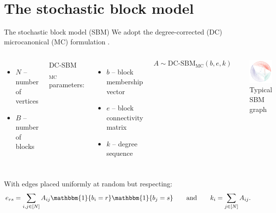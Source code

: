 \documentclass{beamer}
\newcommand{\one}{\mathbbm{1}}
\begin{document}
\section{The stochastic block model}
	
	\begin{frame}{The stochastic block model (SBM)}
		We adopt the degree-corrected (DC) microcanonical (MC) formulation \cite{Peixoto-Bayesian-Microcanonical}.				
		\begin{columns}
			
			
			\begin{itemize}
				\item $N$ -- number of vertices
				\item $B$ -- number of blocks
			\end{itemize}
			\vspace{0.3cm}
			DC-SBM$_{\textrm{MC}}$ parameters:
			\begin{itemize}
				\item $b$ -- block membership vector
				\item $e$ -- block connectivity matrix
				\item $k$ -- degree sequence
			\end{itemize}
			
			$$A \sim \textrm{DC-SBM}_{\textrm{MC}}(b, e, k)$$
			
		
			\begin{figure}
				\includegraphics[width=0.6\linewidth]{polbooks-graph}
				\caption{Typical SBM graph}
			\end{figure}
		\end{columns}
		With edges placed uniformly at random but respecting:
		\begin{equation*}
			e_{rs} = \sum_{i, j \in [N]} A_{ij} 
			\one \{b_i = r\} \one \{b_j = s\} 
			\qquad 
			\textrm{and} \qquad
			k_i = \sum_{j \in [N]} A_{ij}.
			\label{eqn:sbm-constraints}
		\end{equation*}
	\end{frame}
\end{document}
